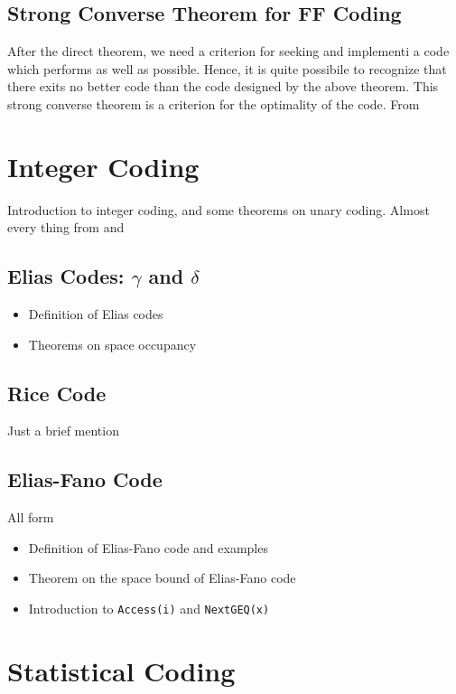 \subsection{Strong Converse Theorem for FF Coding}
After the direct theorem, we need a criterion for seeking and implementi a code which performs as well as possible. Hence, it is quite possibile to recognize that there exits no better code than the code designed by the above theorem. This strong converse theorem is a criterion for the optimality of the code. From \cite{han2002mathematics}

\section{Integer Coding}

Introduction to integer coding, and some theorems on unary coding. Almost every thing from \cite{ferragina2023pearls} and \cite{han2002mathematics}

\subsection{Elias Codes: $\gamma$ and $\delta$}
\begin{itemize}
    \item Definition of Elias codes
    \item Theorems on space occupancy
\end{itemize}

\subsection{Rice Code}
Just a brief mention
\subsection{Elias-Fano Code}
All form \cite{ferragina2023pearls,sayood2002lossless}
\begin{itemize}
    \item Definition of Elias-Fano code and examples
    \item Theorem on the space bound of Elias-Fano code
    \item Introduction to \texttt{Access(i)} and \texttt{NextGEQ(x)}
\end{itemize}

\section{Statistical Coding}

